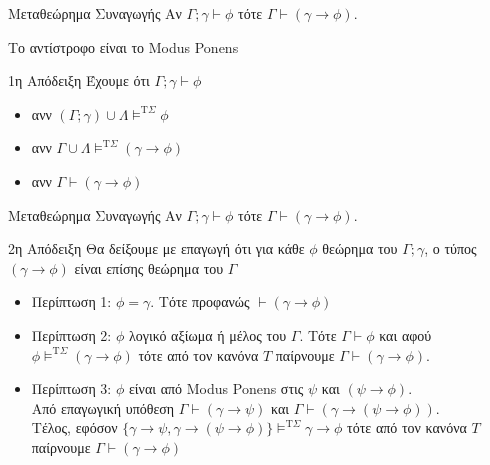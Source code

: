 \documentclass{beamer}
\begin{document}
\begin{frame}{Μεταθεώρημα Συναγωγής}
  Αν $\Gamma ; \gamma \vdash \phi$ τότε $\Gamma \vdash (\gamma \rightarrow \phi)$.\\
  \begin{small}Το αντίστροφο είναι το Modus Ponens\end{small}
  \begin{block}{1η Απόδειξη}
    Έχουμε ότι $\Gamma ; \gamma \vdash \phi$
    \begin{itemize}
      \item[] ανν $(\Gamma ; \gamma) \cup \Lambda \models^{\textrm{T}\Sigma} \phi$
      \item[] ανν $\Gamma \cup \Lambda \models^{\textrm{T}\Sigma} (\gamma \rightarrow \phi)$
      \item[] ανν $\Gamma \vdash (\gamma \rightarrow \phi)$
    \end{itemize}
  \end{block}
\end{frame}
\begin{frame}{Μεταθεώρημα Συναγωγής}
  Αν $\Gamma ; \gamma \vdash \phi$ τότε $\Gamma \vdash (\gamma \rightarrow \phi)$.
  \begin{block}{2η Απόδειξη}
    Θα δείξουμε με επαγωγή ότι για κάθε $\phi$ θεώρημα του $\Gamma ; \gamma$, ο τύπος $(\gamma \rightarrow \phi)$ είναι επίσης θεώρημα του $\Gamma$
    \begin{itemize}
      \item Περίπτωση 1: $\phi = \gamma$. Τότε προφανώς $\vdash (\gamma \rightarrow \phi)$
      \item Περίπτωση 2: $\phi$ λογικό αξίωμα ή μέλος του $\Gamma$.
        Τότε $\Gamma \vdash \phi$ και αφού $\phi \models^{\textrm{T}\Sigma} (\gamma \rightarrow \phi)$ τότε από τον κανόνα $T$ παίρνουμε $\Gamma \vdash (\gamma \rightarrow \phi)$.
      \item Περίπτωση 3: $\phi$ είναι από Modus Ponens στις $\psi$ και $(\psi \rightarrow \phi)$.\\
        Από επαγωγική υπόθεση $\Gamma \vdash (\gamma \rightarrow \psi)$ και $\Gamma \vdash (\gamma \rightarrow (\psi \rightarrow \phi))$.\\
        Τέλος, εφόσον $\{\gamma \rightarrow \psi, \gamma \rightarrow (\psi \rightarrow \phi)\} \models^{\textrm{T}\Sigma} \gamma \rightarrow \phi$ τότε από τον κανόνα $T$ παίρνουμε $\Gamma \vdash (\gamma \rightarrow \phi)$
    \end{itemize}
  \end{block}
\end{frame}
\end{document}
